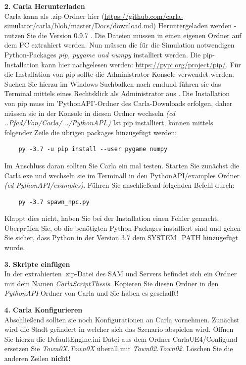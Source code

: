 \begin{itemize}
	\item[\textbf{2.}] \textbf{Carla Herunterladen}\\
	Carla kann als .zip-Ordner hier (\url{https://github.com/carla-simulator/carla/blob/master/Docs/download.md}) Heruntergeladen werden - nutzen Sie die Version 0.9.7 . Die Dateien müssen in einen eigenen Ordner auf dem PC extrahiert werden. Nun müssen die für die Simulation notwendigen  Python-Packages \textit{pip, pygame und numpy} installiert werden. Die pip-Installation kann hier nachgelesen werden: \url{https://pypi.org/project/pip/}. Für die Installation von pip sollte die Administrator-Konsole verwendet werden. Suchen Sie hierzu im Windows Suchbalken nach \glqq cmd\grqq und führen sie das Terminal mittels eines Rechtsklick \glqq als Administrator aus \grqq. Die Installation von pip muss im 'PythonAPI'-Ordner des Carla-Downloads erfolgen, daher müssen sie in der Konsole in diesen Ordner wechseln \textit{(cd ..Pfad/Von/Carla/.../PythonAPI.)} Ist pip installiert, können mittels folgender Zeile die übrigen packages hinzugefügt werden:
	\begin{verbatim}
	py -3.7 -u pip install --user pygame numpy 
	\end{verbatim}
	Im Anschluss daran sollten Sie Carla ein mal testen. Starten Sie zunächst die Carla.exe und wechseln sie im Terminall in den PythonAPI/examples Ordner \textit{(cd PythonAPI/examples)}. Führen Sie anschließend folgenden Befehl durch:
	\begin{verbatim}
	py -3.7 spawn_npc.py
	\end{verbatim}
	Klappt dies nicht, haben Sie bei der Installation einen Fehler gemacht. Überprüfen Sie, ob die benötigten Python-Packages installiert sind und gehen Sie sicher, dass Python in der Version 3.7 dem SYSTEM\_PATH hinzugefügt wurde.
	\item[\textbf{3.}] \textbf{Skripte einfügen}\\
	In der extrahierten .zip-Datei des SAM und Servers befindet sich ein Ordner mit dem Namen \textit{CarlaScriptThesis}. Kopieren Sie diesen Ordner in den \textit{PythonAPI}-Ordner von Carla und Sie haben es geschafft! 
	\item[\textbf{4.}] \textbf{Carla Konfigurieren}\\
	Abschließend sollten sie noch Konfigurationen an Carla vornehmen. Zunächst wird die Stadt geändert in welcher sich das Szenario abspielen wird. Öffnen Sie hierzu die \glqq DefaultEngine.ini \grqq Datei aus dem Ordner \grqq CarlaUE4/Config\glqq und ersetzen Sie \textit{Town0X.Town0X} überall mit \textit{Town02.Town02}. Löschen Sie die anderen Zeilen \textbf{nicht!}

\end{itemize}
